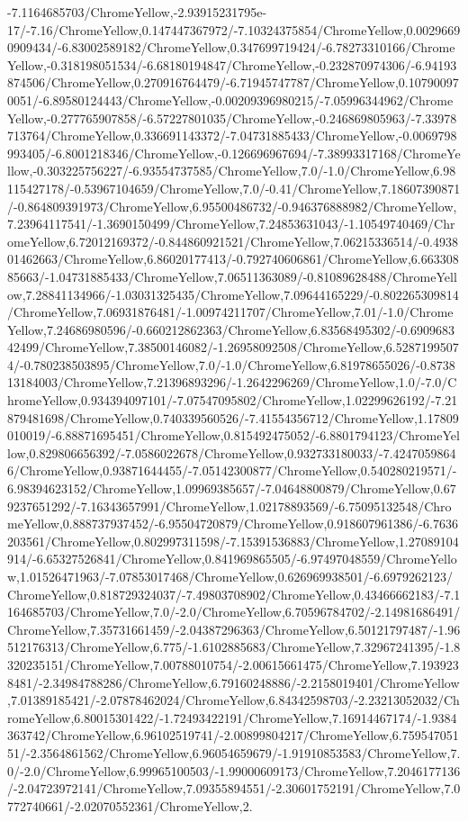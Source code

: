 {\begin{tikzternal}
{-7.1164685703/ChromeYellow,-2.93915231795e-17/-7.16/ChromeYellow,0.147447367972/-7.10324375854/ChromeYellow,0.00296690909434/-6.83002589182/ChromeYellow,0.347699719424/-6.78273310166/ChromeYellow,-0.318198051534/-6.68180194847/ChromeYellow,-0.232870974306/-6.94193874506/ChromeYellow,0.270916764479/-6.71945747787/ChromeYellow,0.107900970051/-6.89580124443/ChromeYellow,-0.00209396980215/-7.05996344962/ChromeYellow,-0.277765907858/-6.57227801035/ChromeYellow,-0.246869805963/-7.33978713764/ChromeYellow,0.336691143372/-7.04731885433/ChromeYellow,-0.0069798993405/-6.8001218346/ChromeYellow,-0.126696967694/-7.38993317168/ChromeYellow,-0.303225756227/-6.93554737585/ChromeYellow,7.0/-1.0/ChromeYellow,6.98115427178/-0.53967104659/ChromeYellow,7.0/-0.41/ChromeYellow,7.18607390871/-0.864809391973/ChromeYellow,6.95500486732/-0.946376888982/ChromeYellow,7.23964117541/-1.3690150499/ChromeYellow,7.24853631043/-1.10549740469/ChromeYellow,6.72012169372/-0.844860921521/ChromeYellow,7.06215336514/-0.493801462663/ChromeYellow,6.86020177413/-0.792740606861/ChromeYellow,6.66330885663/-1.04731885433/ChromeYellow,7.06511363089/-0.81089628488/ChromeYellow,7.28841134966/-1.03031325435/ChromeYellow,7.09644165229/-0.802265309814/ChromeYellow,7.06931876481/-1.00974211707/ChromeYellow,7.01/-1.0/ChromeYellow,7.24686980596/-0.660212862363/ChromeYellow,6.83568495302/-0.690968342499/ChromeYellow,7.38500146082/-1.26958092508/ChromeYellow,6.52871995074/-0.780238503895/ChromeYellow,7.0/-1.0/ChromeYellow,6.81978655026/-0.873813184003/ChromeYellow,7.21396893296/-1.2642296269/ChromeYellow,1.0/-7.0/ChromeYellow,0.934394097101/-7.07547095802/ChromeYellow,1.02299626192/-7.21879481698/ChromeYellow,0.740339560526/-7.41554356712/ChromeYellow,1.17809010019/-6.88871695451/ChromeYellow,0.815492475052/-6.8801794123/ChromeYellow,0.829806656392/-7.0586022678/ChromeYellow,0.932733180033/-7.42470598646/ChromeYellow,0.93871644455/-7.05142300877/ChromeYellow,0.540280219571/-6.98394623152/ChromeYellow,1.09969385657/-7.04648800879/ChromeYellow,0.679237651292/-7.16343657991/ChromeYellow,1.02178893569/-6.75095132548/ChromeYellow,0.888737937452/-6.95504720879/ChromeYellow,0.918607961386/-6.7636203561/ChromeYellow,0.802997311598/-7.15391536883/ChromeYellow,1.27089104914/-6.65327526841/ChromeYellow,0.841969865505/-6.97497048559/ChromeYellow,1.01526471963/-7.07853017468/ChromeYellow,0.626969938501/-6.6979262123/ChromeYellow,0.818729324037/-7.49803708902/ChromeYellow,0.43466662183/-7.1164685703/ChromeYellow,7.0/-2.0/ChromeYellow,6.70596784702/-2.14981686491/ChromeYellow,7.35731661459/-2.04387296363/ChromeYellow,6.50121797487/-1.96512176313/ChromeYellow,6.775/-1.6102885683/ChromeYellow,7.32967241395/-1.8320235151/ChromeYellow,7.00788010754/-2.00615661475/ChromeYellow,7.1939238481/-2.34984788286/ChromeYellow,6.79160248886/-2.2158019401/ChromeYellow,7.01389185421/-2.07878462024/ChromeYellow,6.84342598703/-2.23213052032/ChromeYellow,6.80015301422/-1.72493422191/ChromeYellow,7.16914467174/-1.9384363742/ChromeYellow,6.96102519741/-2.00899804217/ChromeYellow,6.75954705151/-2.3564861562/ChromeYellow,6.96054659679/-1.91910853583/ChromeYellow,7.0/-2.0/ChromeYellow,6.99965100503/-1.99000609173/ChromeYellow,7.2046177136/-2.04723972141/ChromeYellow,7.09355894551/-2.30601752191/ChromeYellow,7.0772740661/-2.02070552361/ChromeYellow,2.}
\end{tikzternal}}
